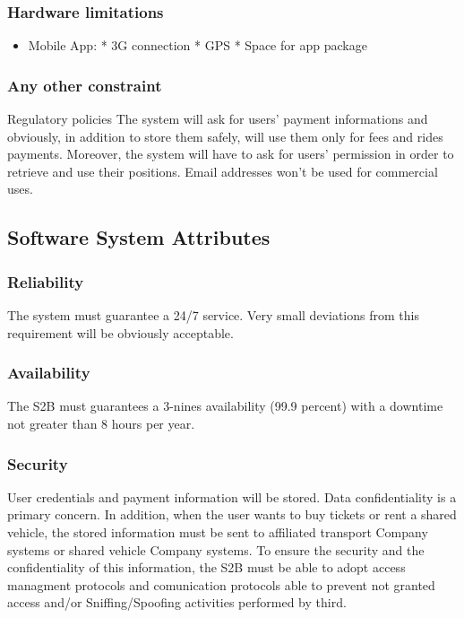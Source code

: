	\subsubsection{Hardware limitations}
		\begin{itemize}
		\item Mobile App: \newline
		* 3G connection\newline
		* GPS\newline
		* Space for app package
		\end{itemize}
	
	\subsubsection{Any other constraint}
	Regulatory policies
	The system will ask for users' payment informations and obviously, in addition to store them
	safely, will use them only for fees and rides payments.
	Moreover, the system will have to ask for users' permission in order to retrieve and use their
	positions.
	Email addresses won't be used for commercial uses.
\subsection{Software System Attributes} 
	\subsubsection{Reliability}
	The system must guarantee a 24/7 service. Very small deviations from this requirement will be
	obviously acceptable.
	\subsubsection{Availability}
	The S2B must guarantees a 3-nines availability (99.9 percent) with a downtime not greater than 8 hours per year.
	\subsubsection{Security}
User credentials and payment information will be stored. Data confidentiality is a primary concern.
In addition, when the user wants to buy tickets or rent a shared vehicle, the stored information must be sent to affiliated  transport Company systems or shared vehicle Company  systems. To ensure the security and the confidentiality of this information, the S2B must be able to adopt  access managment protocols and comunication protocols able to prevent not granted access and/or Sniffing/Spoofing activities performed by third.
	
